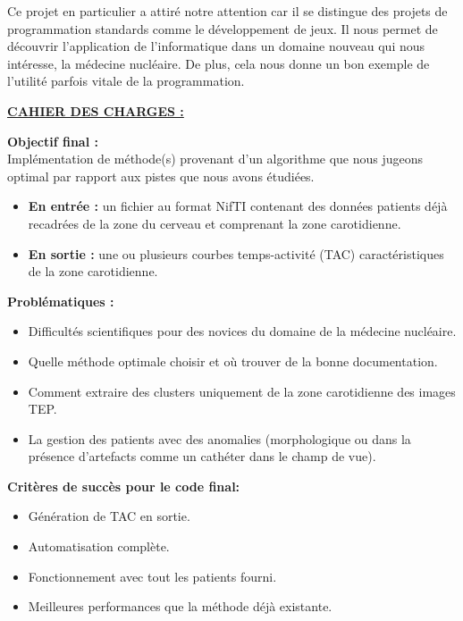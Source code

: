 \documentclass[a4paper]{article}
\begin{document}
    \noindent Ce projet en particulier a attiré notre attention car il se distingue des projets de programmation standards comme le 
    développement de jeux. Il nous permet de découvrir l’application de l’informatique dans un domaine nouveau qui nous 
    intéresse, la médecine nucléaire. De plus, cela nous donne un bon exemple de l’utilité parfois vitale de la programmation.\\

    \vspace{0.3cm}

\noindent\underline{\textbf{CAHIER DES CHARGES :}}

    \vspace{0.2cm}
    \noindent\textbf{Objectif final :}\\
    Implémentation de méthode(s) provenant d’un algorithme que nous jugeons optimal par rapport aux pistes que nous avons étudiées.
    \begin{itemize}
        \item \textbf{En entrée :} un fichier au format NifTI contenant des données patients déjà recadrées de la zone du cerveau et comprenant la zone carotidienne.
        \item \textbf{En sortie :} une ou plusieurs courbes temps-activité (TAC) caractéristiques de la zone carotidienne.
    \end{itemize}

    \vspace{0.2cm}
    \noindent\textbf{Problématiques :}
    \begin{itemize}
        \item Difficultés scientifiques pour des novices du domaine de la médecine nucléaire.
        \item Quelle méthode optimale choisir et où trouver de la bonne documentation.
        \item Comment extraire des clusters uniquement de la zone carotidienne des images TEP.
        \item La gestion des patients avec des anomalies (morphologique ou dans la présence d'artefacts comme un cathéter dans le champ de vue).
    \end{itemize}
    
    \vspace{0.2cm}
    \noindent\textbf{Critères de succès pour le code final:}
    \begin{itemize}
        \item Génération de TAC en sortie.
        \item Automatisation complète.
        \item Fonctionnement avec tout les patients fourni.
        \item Meilleures performances que la méthode déjà existante.\\
    \end{itemize}
    
\end{document}
